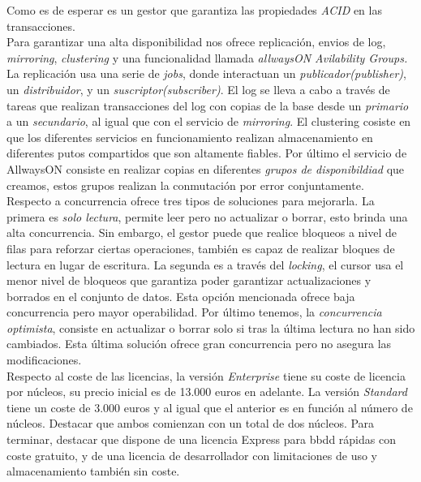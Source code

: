 \documentclass{article}
\begin{document}
Como es de esperar es un gestor que garantiza las propiedades \emph{ACID} en las transacciones.\\
Para garantizar una alta disponibilidad nos ofrece replicación, envios de log, \emph{mirroring}, \emph{clustering} y una funcionalidad llamada \emph{allwaysON Avilability Groups.} La replicación usa una serie de \emph{jobs}, donde interactuan un \emph{publicador(publisher)}, un \emph{distribuidor}, y un \emph{suscriptor(subscriber)}. El log se lleva a cabo a través de tareas que realizan transacciones del log con copias de la base desde un \emph{primario} a un \emph{secundario}, al igual que con el servicio de \emph{mirroring}. El clustering cosiste en que los diferentes servicios en funcionamiento realizan almacenamiento en diferentes putos compartidos que son altamente fiables. Por último el servicio de AllwaysON consiste en realizar copias en diferentes \emph{grupos de disponibildiad} que creamos, estos grupos realizan la conmutación por error conjuntamente.\\

Respecto a concurrencia ofrece tres tipos de soluciones para mejorarla. La primera es \emph{solo lectura}, permite leer pero no actualizar o borrar, esto brinda una alta concurrencia. Sin embargo, el gestor puede que realice bloqueos a nivel de filas para reforzar ciertas operaciones, también es capaz de realizar bloques de lectura en lugar de escritura. La segunda es a través del \emph{locking}, el cursor usa el menor nivel de bloqueos que garantiza poder garantizar actualizaciones y borrados en el conjunto de datos. Esta opción mencionada ofrece baja concurrencia pero mayor operabilidad. Por último tenemos, la \emph{concurrencia optimista}, consiste en actualizar o borrar solo si tras la última lectura no han sido cambiados. Esta última solución ofrece gran concurrencia pero no asegura las modificaciones.\\
Respecto al coste de las licencias, la versión \emph{Enterprise} tiene su coste de licencia por núcleos, su precio inicial es de 13.000 euros en adelante. La versión \emph{Standard} tiene un coste de 3.000 euros y al igual que el anterior es en función al número de núcleos. Destacar que ambos comienzan con un total de dos núcleos. Para terminar, destacar que dispone de una licencia Express para bbdd rápidas con coste gratuito, y de una licencia de desarrollador con limitaciones de uso y almacenamiento también sin coste.








\newpage


\end{document}
